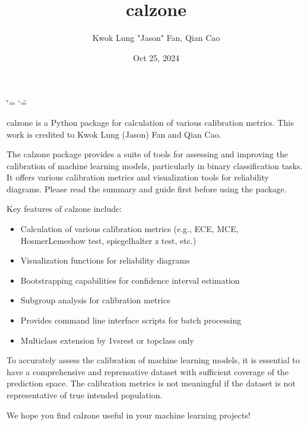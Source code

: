 \documentclass[letterpaper,10pt,english]{sphinxmanual}
\title{calzone}
\date{Oct 25, 2024}
\author{Kwok Lung "Jason" Fan, Qian Cao}
\begin{document}
\ifdefined\shorthandoff
  \ifnum\catcode`\=\string=\active\shorthandoff{=}\fi
  \ifnum\catcode`\"=\active{}\fi
\fi

\pagestyle{empty}
\sphinxmaketitle
\pagestyle{plain}
\sphinxtableofcontents
\pagestyle{normal}
\label{\detokenize{index::doc}}


\sphinxAtStartPar
calzone is a Python package for calculation of various calibration metrics. This work is credited to Kwok Lung (Jason) Fan and Qian Cao.

\sphinxAtStartPar
The calzone package provides a suite of tools for assessing and improving the calibration of machine learning models, particularly in binary classification tasks. It offers various calibration metrics and visualization tools for reliability diagrams.  Please read the summary and guide first  before using the package.

\sphinxAtStartPar
Key features of calzone include:
\begin{itemize}
\item {} 
\sphinxAtStartPar
Calculation of various calibration metrics (e.g., ECE, MCE, Hosmer\sphinxhyphen{}Lemeshow test, spiegelhalter z test, etc.)

\item {} 
\sphinxAtStartPar
Visualization functions for reliability diagrams

\item {} 
\sphinxAtStartPar
Bootstrapping capabilities for confidence interval estimation

\item {} 
\sphinxAtStartPar
Subgroup analysis for calibration metrics

\item {} 
\sphinxAtStartPar
Provides command line interface scripts for batch processing

\item {} 
\sphinxAtStartPar
Multi\sphinxhyphen{}class extension by 1\sphinxhyphen{}vs\sphinxhyphen{}rest or top\sphinxhyphen{}class only

\end{itemize}

\sphinxAtStartPar
To accurately assess the calibration of machine learning models, it is essential to have a comprehensive and reprensative dataset with sufficient coverage of the prediction space. The calibration metrics is not meaningful if the dataset is not representative of true intended population.

\sphinxAtStartPar
We hope you find calzone useful in your machine learning projects!
\end{document}
